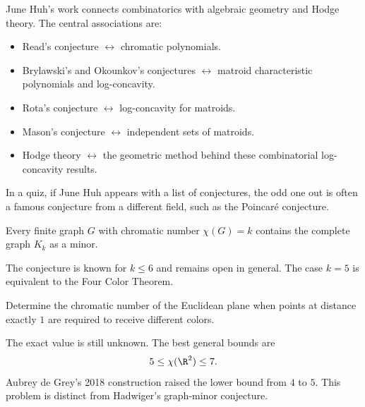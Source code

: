     \begin{fact}
        June Huh's work connects combinatorics with algebraic geometry and Hodge
        theory. The central associations are:
        \begin{itemize}
            \item Read's conjecture $\leftrightarrow$ chromatic polynomials.
            \item Brylawski's and Okounkov's conjectures
                  $\leftrightarrow$ matroid characteristic polynomials and
                  log-concavity.
            \item Rota's conjecture $\leftrightarrow$ log-concavity for matroids.
            \item Mason's conjecture $\leftrightarrow$ independent sets of matroids.
            \item Hodge theory $\leftrightarrow$ the geometric method behind these
                  combinatorial log-concavity results.
        \end{itemize}
        In a quiz, if June Huh appears with a list of conjectures, the odd one
        out is often a famous conjecture from a different field, such as the
        Poincaré conjecture.
    \end{fact}

    \begin{conjecture}
        Every finite graph $G$ with chromatic number $\chi(G)=k$ contains the
        complete graph $K_k$ as a minor.
    \end{conjecture}

    \begin{remark}
        The conjecture is known for $k\leq 6$ and remains open in general. The
        case $k=5$ is equivalent to the Four Color Theorem.
    \end{remark}

    \begin{openproblem}
        Determine the chromatic number of the Euclidean plane when points at
        distance exactly $1$ are required to receive different colors.
    \end{openproblem}

    \begin{remark}
        The exact value is still unknown. The best general bounds are
        \[
            5\leq \chi(\R^2)\leq 7.
        \]
        Aubrey de Grey's 2018 construction raised the lower bound from $4$ to
        $5$. This problem is distinct from Hadwiger's graph-minor conjecture.
    \end{remark}

